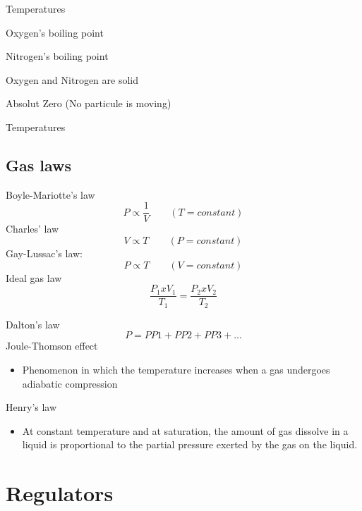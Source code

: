\documentclass[aspectratio=1610,english,12pt]{beamer}
\begin{document}
\begin{frame}{Temperatures}
	\begin{description}[lalign=parleft]
		\item[$-183^{\circ}C$]Oxygen's boiling point
		\item[$-196^{\circ}C$]Nitrogen's boiling point	
		\item[$-220^{\circ}C$]Oxygen and Nitrogen are solid
		\item[$-273^{\circ}C$]Absolut Zero (No particule is moving)
	\end{description}
\end{frame}

\begin{frame}{Temperatures}
\end{frame}

\subsection{Gas laws}
\begin{frame}{\insertsubsection}
	Boyle-Mariotte's law
	\[	P \propto \frac{1}{V} \qquad (T=constant) \]
	Charles' law
	\[	V \propto T \qquad (P=constant)\]
	Gay-Lussac's law:
	\[ P \propto T \qquad (V=constant)\]
	Ideal gas law
	\[	\frac{P_1 x V_1}{T_1} =\frac{P_2 x V_2}{T_2} \]
\end{frame}

\begin{frame}{\insertsubsection}
	Dalton's law
	\[ P = PP1 + PP2 + PP3 +... \]
	Joule-Thomson effect
	\begin{itemize}
		\item Phenomenon in which the temperature increases when a gas undergoes adiabatic compression
	\end{itemize}
	Henry's law
	\begin{itemize}
		\item At constant temperature and at saturation, the amount of gas dissolve in a liquid is proportional to the partial pressure exerted by the gas on the liquid.
	\end{itemize}
\end{frame}


\section{Regulators}
\end{document}
